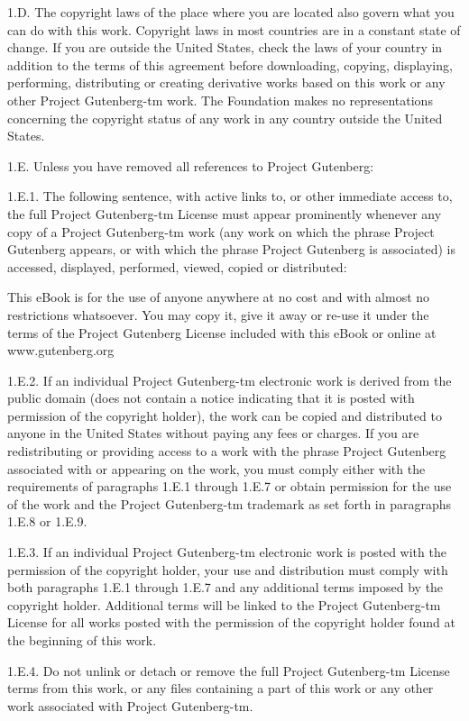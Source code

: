\documentclass[twocolumn]{article}
\begin{document}
1.D.  The copyright laws of the place where you are located also govern
what you can do with this work.  Copyright laws in most countries are in
a constant state of change.  If you are outside the United States, check
the laws of your country in addition to the terms of this agreement
before downloading, copying, displaying, performing, distributing or
creating derivative works based on this work or any other Project
Gutenberg-tm work.  The Foundation makes no representations concerning
the copyright status of any work in any country outside the United
States.

1.E.  Unless you have removed all references to Project Gutenberg:

1.E.1.  The following sentence, with active links to, or other immediate
access to, the full Project Gutenberg-tm License must appear prominently
whenever any copy of a Project Gutenberg-tm work (any work on which the
phrase Project Gutenberg appears, or with which the phrase Project
Gutenberg is associated) is accessed, displayed, performed, viewed,
copied or distributed:

This eBook is for the use of anyone anywhere at no cost and with
almost no restrictions whatsoever.  You may copy it, give it away or
re-use it under the terms of the Project Gutenberg License included
with this eBook or online at www.gutenberg.org

1.E.2.  If an individual Project Gutenberg-tm electronic work is derived
from the public domain (does not contain a notice indicating that it is
posted with permission of the copyright holder), the work can be copied
and distributed to anyone in the United States without paying any fees
or charges.  If you are redistributing or providing access to a work
with the phrase Project Gutenberg associated with or appearing on the
work, you must comply either with the requirements of paragraphs 1.E.1
through 1.E.7 or obtain permission for the use of the work and the
Project Gutenberg-tm trademark as set forth in paragraphs 1.E.8 or
1.E.9.

1.E.3.  If an individual Project Gutenberg-tm electronic work is posted
with the permission of the copyright holder, your use and distribution
must comply with both paragraphs 1.E.1 through 1.E.7 and any additional
terms imposed by the copyright holder.  Additional terms will be linked
to the Project Gutenberg-tm License for all works posted with the
permission of the copyright holder found at the beginning of this work.

1.E.4.  Do not unlink or detach or remove the full Project Gutenberg-tm
License terms from this work, or any files containing a part of this
work or any other work associated with Project Gutenberg-tm.
\end{document}
